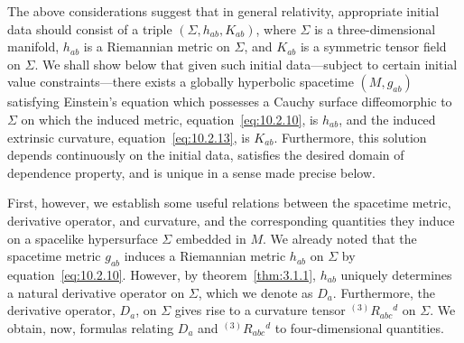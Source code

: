

The above considerations suggest that in general relativity, appropriate initial data
should consist of a triple \((\Sigma,h_{ab},K_{ab})\), where \(\Sigma\) is a
three-dimensional manifold, \(h_{ab}\) is a Riemannian metric on \(\Sigma\), and
\(K_{ab}\) is a symmetric tensor field on \(\Sigma\). We shall show below that given
such initial data---subject to certain initial value constraints---there exists a globally
hyperbolic spacetime \((M,g_{ab})\) satisfying Einstein's equation which possesses a
Cauchy surface diffeomorphic to \(\Sigma\) on which the induced metric,
equation~\eqref{eq:10.2.10}, is \(h_{ab}\), and the induced extrinsic curvature,
equation~\eqref{eq:10.2.13}, is \(K_{ab}\). Furthermore, this solution depends
continuously on the initial data, satisfies the desired domain of dependence property,
and is unique in a sense made precise below.

First, however, we establish some useful relations between the spacetime metric,
derivative operator, and curvature, and the corresponding quantities they induce on a
spacelike hypersurface \(\Sigma\) embedded in \(M\). We already noted that the
spacetime metric \(g_{ab}\) induces a Riemannian metric \(h_{ab}\) on \(\Sigma\) by
equation~\eqref{eq:10.2.10}. However, by theorem~\ref{thm:3.1.1}, \(h_{ab}\)
uniquely determines a natural derivative operator on \(\Sigma\), which we denote as
\(D_a\). Furthermore, the derivative operator, \(D_a\), on \(\Sigma\) gives rise to a
curvature tensor \({}^{(3)}R_{abc}{}^d\) on \(\Sigma\). We obtain, now, formulas
relating \(D_a\) and \({}^{(3)}R_{abc}{}^d\) to four-dimensional quantities.

